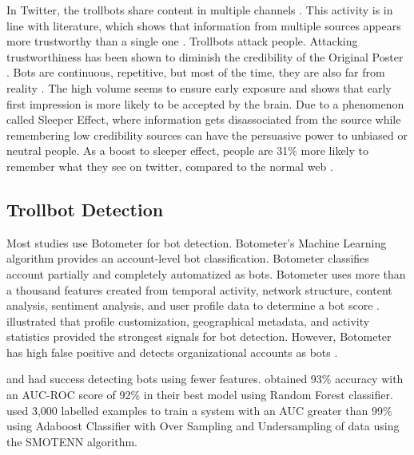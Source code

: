 \documentclass[letterpaper]{article}
\begin{document}
In Twitter, the trollbots share content 
in multiple channels \cite{paul2016russian}. This activity is in line with literature, which shows that information 
from multiple sources appears more trustworthy than a single one \cite{harkins1981multiple}. 
 Trollbots attack people. Attacking trustworthiness has been shown to diminish the credibility of the Original Poster \cite{pornpitakpan2004persuasiveness}. 
Bots are continuous, repetitive, but most of the time, they are also far from reality \cite{paul2016russian}. 
The high volume seems to ensure early exposure and \cite{petty1994think} shows that early
 first impression is more likely to be accepted by the brain. Due to a phenomenon called Sleeper Effect, where information gets disassociated from the source while remembering \cite{underwood1998memory,paul2016russian}
 low credibility sources can have the persuasive power to unbiased or neutral people. As a boost to sleeper effect, people are 31\% more likely to remember what they see on twitter, 
 compared to the normal web \cite{twitter_remember}. \par

\subsection{Trollbot Detection}
Most studies \cite{rizoiu2018debatenight,yang2019arming,shao2018spread} use Botometer\cite{davis2016botornot,yang2019arming} for bot detection.
Botometer's Machine Learning algorithm provides an account-level bot classification. Botometer classifies account 
partially and completely automatized as bots. 
Botometer uses more than a thousand features created from temporal activity, network structure, content analysis, sentiment analysis, and user profile data to
determine a bot score \cite{davis2016botornot,yang2019arming}. \cite{bessi2016social} illustrated that profile 
customization, geographical metadata, and activity statistics provided the strongest signals for bot detection.
However, Botometer has high false positive and detects organizational accounts as bots \cite{varol2017early} \cite{botometer_tweet}.
\par

\cite{ferrara2017disinformation} and \cite{kudugunta2018deep} had success detecting bots using fewer features. 
\cite{ferrara2017disinformation} obtained 93\% accuracy with an AUC-ROC score of 92\% in their best model 
using Random Forest classifier. \cite{kudugunta2018deep} used 3,000 labelled examples to train a system with an 
AUC greater than 99\% using Adaboost Classifier with Over Sampling and Undersampling of data using the SMOTENN 
algorithm. \par
\end{document}
